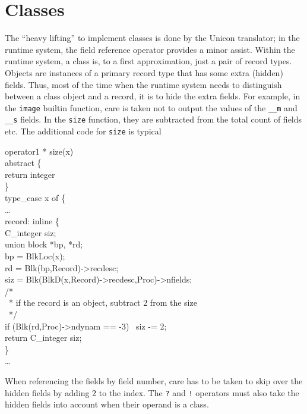 \section{Classes}
The ``heavy lifting'' to implement classes is done by the Unicon translator;
in the runtime system, the field reference operator provides a minor
assist. Within the runtime system, a class is, to a first approximation,
just a pair of record types. Objects are instances of a primary record type
that has some extra (hidden) fields. Thus, most of the time when the runtime
system needs to distinguish between a class object and a record, it is to
hide the extra fields. For example, in the \texttt{image} builtin function,
care is taken not to output the values of the \texttt{\_\_m} and
\texttt{\_\_s} fields. In the \texttt{size} function, they are subtracted
from the total count of fields etc. The additional code for \texttt{size} is
typical
\begin{iconcode}
operator{1} * size(x)\\
\>   abstract \{\\
\>\>      return integer\\
\>      \}\\
\>   type\_case x of \{\\
\ldots\\
\>      record: inline \{\\
\>\>         C\_integer siz;\\
\>\>	 union block *bp, *rd;\\
\>\>	 bp = BlkLoc(x);\\
\>\>	 rd = Blk(bp,Record)->recdesc;\\
\>\>         siz = Blk(BlkD(x,Record)->recdesc,Proc)->nfields;\\
\>	 {\color{blue}/*}\\
\>	 {\color{blue}~* if the record is an object, subtract 2 from the size}\\
\>	 {\color{blue}~*/}\\
\>\> {\color{blue} if (Blk(rd,Proc)->ndynam == -3)~ siz -= 2;}\\
\>\>         return C\_integer siz;\\
\>         \}\\
\ldots\\
\end{iconcode}

When referencing the fields by field number, care has to be taken to skip
over the hidden fields by adding 2 to the index.  The \texttt{?} and
\texttt{!}  operators must also take the hidden fields into account when
their operand is a class.

